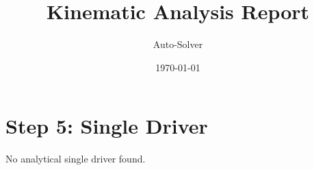 \documentclass[12pt, a4paper]{article}
\title{\textbf{Kinematic Analysis Report}}
\author{Auto-Solver}
\date{\today}
\begin{document}
\maketitle
\section*{Step 5: Single Driver}
No analytical single driver found.
\end{document}

